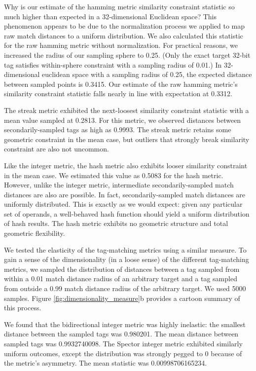 Why is our estimate of the hamming metric similarity constraint statistic so much higher than expected in a 32-dimensional Euclidean space?
This phenomenon appears to be due to the normalization process we applied to map raw match distances to a uniform distribution.
We also calculated this statistic for the raw hamming metric without normalization.
For practical reasons, we increased the radius of our sampling sphere to 0.25.
(Only the exact target 32-bit tag satisfies within-sphere constraint with a sampling radius of 0.01.)
In 32-dimensional euclidean space with a sampling radius of 0.25, the expected distance between sampled points is 0.3415.
Our estimate of the raw hamming metric's similarity constraint statistic falls nearly in line with expectation at 0.3312.

The streak metric exhibited the next-loosest similarity constraint statistic with a mean value sampled at 0.2813.
For this metric, we observed distances between secondarily-sampled tags as high as 0.9993.
The streak metric retains some geometric constraint in the mean case, but outliers that strongly break similarity constraint are also not uncommon.

Like the integer metric, the hash metric also exhibits looser similarity constraint in the mean case.
We estimated this value as 0.5083 for the hash metric.
However, unlike the integer metric, intermediate secondarily-sampled match distances are also are possible.
In fact, secondarily-sampled match distances are uniformly distributed.
This is exactly as we would expect:
given any particular set of operands, a well-behaved hash function should yield a uniform distribution of hash results.
The hash metric exhibits no geometric structure and total geometric flexibility.



We tested the elasticity of the tag-matching metrics using a similar measure.
To gain a sense of the dimensionality (in a loose sense) of the different tag-matching metrics, we sampled the distribution of distances between a tag sampled from within a 0.01 match distance radius of an arbitrary target and a tag sampled from outside a 0.99 match distance radius of the arbitrary target.
We used 5000 samples.
Figure \ref{fig:dimensionality_measure}b provides a cartoon summary of this process.

We found that the bidirectional integer metric was highly inelastic: the smallest distance between the sampled tags was 0.980201.
The mean distance between sampled tags was 0.9932740098.
The Spector integer metric exhibited similarly uniform outcomes, except the distribution was strongly pegged to 0 because of the metric's asymmetry.
The mean statistic was 0.00998706165234.

